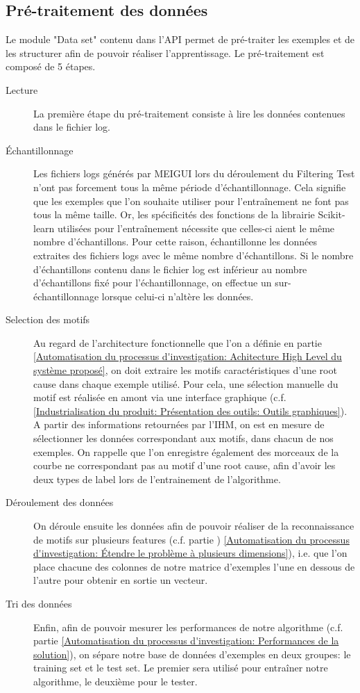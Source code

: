 \subsection{Pré-traitement des données}
\label{Industrialisation du produit: API: Pré-traitement et traitement des données}
Le module "Data set" contenu dans l'API permet de pré-traiter les exemples et de les structurer afin de pouvoir réaliser l'apprentissage. 
Le pré-traitement est composé de 5 étapes.
\begin{description}
	\item [Lecture] La première étape du pré-traitement consiste à lire les données contenues dans le fichier log. 
	\item [Échantillonnage] Les fichiers logs générés par MEIGUI lors du déroulement du Filtering Test n'ont pas forcement tous la même période d'échantillonnage. Cela signifie que les exemples que l'on souhaite utiliser pour l'entraînement ne font pas tous la même taille. Or, les spécificités des fonctions de la librairie Scikit-learn utilisées pour l'entraînement nécessite que celles-ci aient le même nombre d'échantillons. Pour cette raison, échantillonne les données extraites des fichiers logs avec le même nombre d'échantillons. Si le nombre d'échantillons contenu dans le fichier log est inférieur au nombre d'échantillons fixé pour l'échantillonnage, on effectue un sur-échantillonnage lorsque celui-ci n'altère les données. 
	\item [Selection des motifs] Au regard de l'architecture fonctionnelle que l'on a définie en partie \ref{Automatisation du processus d'investigation: Achitecture High Level du système proposé}, on doit extraire les motifs caractéristiques d'une root cause dans chaque exemple utilisé. Pour cela, une sélection manuelle du motif est réalisée en amont via une interface graphique (c.f. \ref{Industrialisation du produit: Présentation des outils: Outils graphiques}). A partir des informations retournées par l'IHM, on est en mesure de sélectionner les données correspondant aux motifs, dans chacun de nos exemples. On rappelle que l'on enregistre également des morceaux de la courbe ne correspondant pas au motif d'une root cause, afin d'avoir les deux types de label lors de l'entrainement de l'algorithme.
	\item [Déroulement des données] On déroule ensuite les données afin de pouvoir réaliser de la reconnaissance de motifs sur plusieurs features (c.f. partie ) \ref{Automatisation du processus d'investigation: Étendre le problème à plusieurs dimensions}), i.e. que l'on place chacune des colonnes de notre matrice d'exemples l'une en dessous de l'autre pour obtenir en sortie un vecteur. 
	\item [Tri des données] Enfin, afin de pouvoir mesurer les performances de notre algorithme (c.f. partie \ref{Automatisation du processus d'investigation: Performances de la solution}), on sépare notre base de données d'exemples en deux groupes: le training set et le test set. Le premier sera utilisé pour entraîner notre algorithme, le deuxième pour le tester. 
\end{description}

